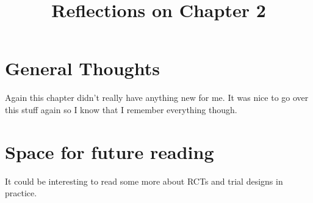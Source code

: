 \documentclass[10pt, english]{article}
\begin{document}
\title{Reflections on Chapter 2}
\date{}

\maketitle


\section*{General Thoughts}
Again this chapter didn't really have anything new for me. It was nice to go over this stuff again so I know that I remember everything though.


\section*{Space for future reading}
It could be interesting to read some more about RCTs and trial designs in practice.
\end{document}
